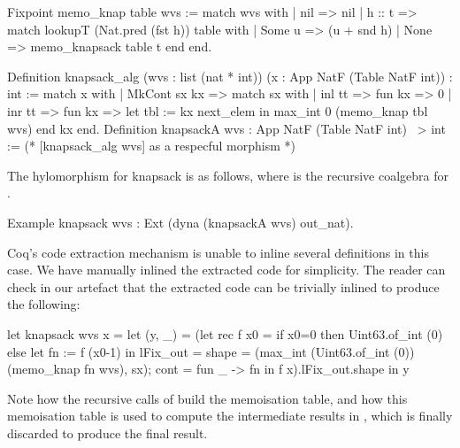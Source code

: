 \documentclass{llncs}
\begin{document}
\begin{coqcode}
Fixpoint memo_knap table wvs :=
  match wvs with | nil => nil | h :: t =>
      match lookupT (Nat.pred (fst h)) table with
      | Some u => (u + snd h)%
      | None => memo_knapsack table t
      end
  end.

Definition knapsack_alg (wvs : list (nat * int))
  (x : App NatF (Table NatF int)) : int :=
  match x with | MkCont sx kx => match sx with
  | inl tt => fun kx => 0%
  | inr tt => fun kx => let tbl := kx next_elem in max_int 0 (memo_knap tbl wvs)
  end kx end.
Definition knapsackA wvs : App NatF (Table NatF int) ~> int := 
  (* [knapsack_alg wvs] as a respecful morphism *)
\end{coqcode}
The hylomorphism for knapsack is as follows, where  is the
recursive coalgebra for .
\begin{coqcode}
Example knapsack wvs : Ext (dyna (knapsackA wvs) out_nat).
\end{coqcode}
Coq's code extraction mechanism is unable to inline several definitions in this
case. We have manually inlined the extracted code for simplicity. The reader
can check in our artefact that the extracted code can be trivially
inlined to produce the following:
\begin{ocamlcode}
let knapsack wvs x = let (y, _) =
    (let rec f x0 =
      if x0=0 then Uint63.of_int (0)
      else let fn := f (x0-1) in { lFix_out = { 
           shape = (max_int (Uint63.of_int (0)) (memo_knap fn wvs), sx);
           cont = fun _ -> fn } }
     in f x).lFix_out.shape in y
\end{ocamlcode}
Note how the recursive calls of  build the memoisation table, and how
this memoisation table is used to compute the intermediate results in
, which is finally discarded to produce the final result.
\end{document}
